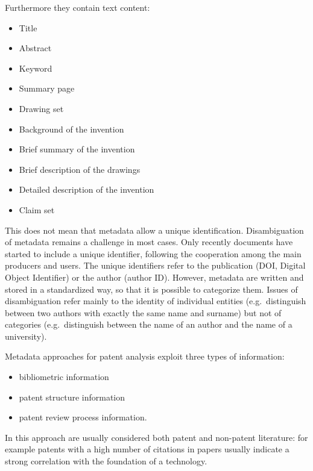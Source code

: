 \documentclass[]{book}
\providecommand{\tightlist}{%
  \setlength{\itemsep}{0pt}\setlength{\parskip}{0pt}}
\begin{document}
Furthermore they contain text content:

\begin{itemize}
\tightlist
\item
  Title
\item
  Abstract
\item
  Keyword
\item
  Summary page
\item
  Drawing set
\item
  Background of the invention
\item
  Brief summary of the invention
\item
  Brief description of the drawings
\item
  Detailed description of the invention
\item
  Claim set
\end{itemize}

This does not mean that metadata allow a unique identification.
Disambiguation of metadata remains a challenge in most cases. Only
recently documents have started to include a unique identifier,
following the cooperation among the main producers and users. The unique
identifiers refer to the publication (DOI, Digital Object Identifier) or
the author (author ID). However, metadata are written and stored in a
standardized way, so that it is possible to categorize them. Issues of
disambiguation refer mainly to the identity of individual entities
(e.g.~distinguish between two authors with exactly the same name and
surname) but not of categories (e.g.~distinguish between the name of an
author and the name of a university).

Metadata approaches for patent analysis exploit three types of
information:

\begin{itemize}
\tightlist
\item
  bibliometric information
\item
  patent structure information
\item
  patent review process information.
\end{itemize}

In this approach are usually considered both patent and non-patent
literature: for example patents with a high number of citations in
papers usually indicate a strong correlation with the foundation of a
technology.
\end{document}
